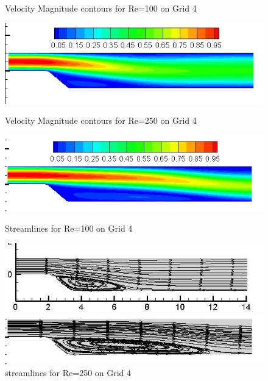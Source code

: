 \documentclass[12pt]{elsarticle}
\begin{document}
	\begin{figure}[h]
		\caption{Velocity Magnitude contours for Re=100 on Grid 4}
		\centering\includegraphics[width=0.7\linewidth]{48_grid4_streamlines_100}
		\caption{Velocity Magnitude contours for Re=250 on Grid 4}
		\centering\includegraphics[width=0.7\linewidth]{49_grid4_streamlines_250}
		\caption{Streamlines for Re=100 on Grid 4}
		\centering\includegraphics[width=0.7\linewidth]{47_grid4_streamlines_100}
		\caption{streamlines for Re=250 on Grid 4}
		\centering\includegraphics[width=0.7\linewidth]{50_grid4_streamlines_250}
	\end{figure}
	
	\clearpage
	
\end{document}
